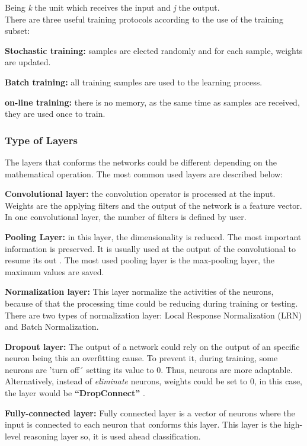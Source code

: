 Being \textit{k} the unit which receives the input and \textit{j} the output.\\

There are three useful training protocols according to the use of the training subset:
\begin{description}[itemsep=2pt,topsep=8pt,parsep=0pt,partopsep=20pt]
	\item \textbf{Stochastic training:} samples are elected randomly and for each sample, weights are updated.
	 \item \textbf{Batch training:} all training samples are used to the learning process.
	 \item \textbf{on-line training:} there is no memory, as the same time as samples are received, they are used once to train.
\end{description}

\subsubsection{Type of Layers}
The layers that conforms the networks could be different depending on the mathematical operation. The most common used layers are described below:
\begin{description}[itemsep=2pt,topsep=8pt,parsep=0pt,partopsep=20pt]
	\item \textbf{Convolutional layer:} the convolution operator is processed at the input. Weights are the applying filters and the output of the network is a feature vector. In one convolutional layer, the number of filters is defined by user.
	\item \textbf{Pooling Layer:} in this layer, the dimensionality is reduced. The most important information is preserved. It is usually used at the output of the convolutional to resume its out \cite{Doorn}. The most used pooling layer is the max-pooling layer, the maximum values are saved.
	\item \textbf{Normalization layer:} This layer normalize the activities of the neurons, because of that the processing time could be reducing during training or testing. There are two types of normalization layer: Local Response Normalization (LRN) and Batch Normalization.
	\item \textbf{Dropout layer:} The output of a network could rely on the output of an specific neuron being this an overfitting cause. To prevent it, during training, some neurons are 'turn off´ setting its value to 0. Thus, neurons are more adaptable. Alternatively, instead of \textit{eliminate} neurons,  weights could be set to 0, in this case, the layer would be \textbf{``DropConnect''} \cite{Doorn}.
	\item  \textbf{Fully-connected layer:} Fully connected layer is a vector of neurons where the input is connected to each neuron that conforms this layer. This layer is the high-level reasoning layer so, it is used ahead classification.
\end{description}

